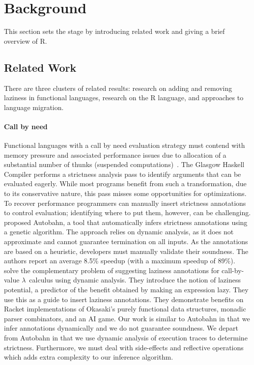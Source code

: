 \documentclass[review,nonacm,screen,acmsmall,anonymous=true]{acmart}
\begin{document}
\newpage
\section{Background}\label{sec:background}

This section sets the stage by introducing related work and giving a brief
overview of R.

\subsection{Related Work}

There are three clusters of related results: research on adding and removing
laziness in functional languages, research on the R language, and approaches to
language migration.

\paragraph{Call by need}  Functional languages with
a call by need evaluation strategy must contend with memory pressure and
associated performance issues due to allocation of a substantial number of
thunks (suspended computations)~\cite{transformopt,stricteffective,opteval}. The
Glasgow Haskell Compiler performs a strictness analysis pass to identify
arguments that can be evaluated eagerly. While most programs benefit from such a
transformation, due to its conservative nature, this pass misses some
opportunities for optimizations. To recover performance programmers can manually
insert strictness annotations to control evaluation; identifying where to put
them, however, can be challenging. \citet{autobahn} proposed Autobahn, a tool
that automatically infers strictness annotations using a genetic algorithm. The
approach relies on dynamic analysis, as it does not approximate and cannot
guarantee termination on all inputs. As the annotations are based on a
heuristic, developers must manually validate their soundness. The authors report
an average 8.5\% speedup (with a maximum speedup of 89\%). \citet{lazyprof}
solve the complementary problem of suggesting laziness annotations for
call-by-value $\lambda$~calculus using dynamic analysis. They introduce the
notion of laziness potential, a predictor of the benefit obtained by making an
expression lazy. They use this as a guide to insert laziness annotations. They
demonstrate benefits on Racket implementations of Okasaki's purely functional
data structures, monadic parser combinators, and an AI game. Our work is similar
to Autobahn in that we infer annotations dynamically and we do not guarantee
soundness. We depart from Autobahn in that we use dynamic analysis of
execution traces to determine strictness. Furthermore, we must deal with
side-effects and reflective operations which adds extra complexity to our
inference algorithm.
\end{document}
